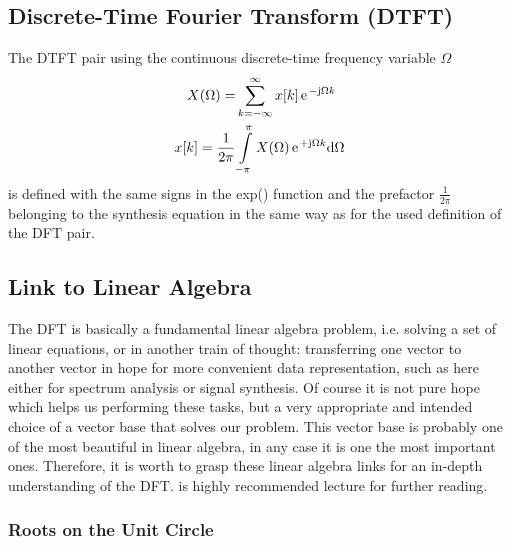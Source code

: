 \documentclass[11pt,a4paper,DIV=12]{scrartcl}
\begin{document}
\subsection{Discrete-Time Fourier Transform (DTFT)}
The DTFT pair using the continuous discrete-time
frequency variable $\Omega$
\begin{align}
X(\Omega)=&\sum_{k=-\infty}^\infty x[k]\,\e^{-\im\Omega k}
\label{eq:DTFT}\\
x[k]=\frac{1}{2\pi}&\int\limits_{-\pi}^\pi X(\Omega)\,\e^{+\im\Omega k}\text{d}\Omega
\end{align}
is defined with the same signs in the exp() function
and the prefactor $\frac{1}{2\pi}$
belonging to the synthesis equation in the same way as for the used definition
of the DFT pair.

\subsection{Link to Linear Algebra}
The DFT is basically a fundamental linear algebra problem, i.e.
solving a set of linear equations, or in another train of thought: transferring
one vector to another vector in hope for more convenient data representation,
such as here either for spectrum analysis or signal synthesis.
%
Of course it is not pure hope which helps us performing these tasks, but
a very appropriate and intended choice of a vector base that solves our problem.
%
This vector base is probably one of the most beautiful in linear algebra,
in any case it is one the most important ones.
%
Therefore, it is worth to grasp these linear algebra links for an in-depth
understanding of the DFT.
%
\cite{Strang2019} is highly recommended lecture for further reading.

\subsubsection{Roots on the Unit Circle}
\end{document}
